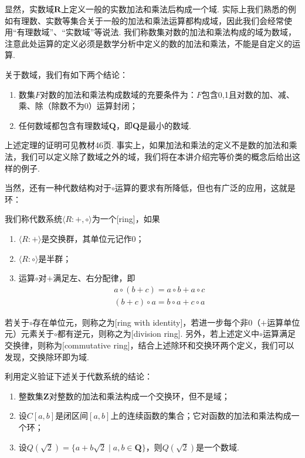 显然，实数域$\mathbf{R}$上定义一般的实数加法和乘法后构成一个域. 实际上我们熟悉的例如有理数、实数等集合关于一般的加法和乘法运算都构成域，因此我们会经常使用``有理数域''、``实数域''等说法. 我们称数集对数的加法和乘法构成的域为数域，注意此处运算的定义必须是数学分析中定义的数的加法和乘法，不能是自定义的运算.
\begin{theorem}
    关于数域，我们有如下两个结论：
    \begin{enumerate}
        \item 数集$F$对数的加法和乘法构成数域的充要条件为：$F$包含0,1且对数的加、减、乘、除（除数不为0）运算封闭；

        \item 任何数域都包含有理数域$\mathbf{Q}$，即$\mathbf{Q}$是最小的数域.
    \end{enumerate}
\end{theorem}

上述定理的证明可见教材46页. 事实上，如果加法和乘法的定义不是数的加法和乘法，我们可以定义除了数域之外的域，我们将在本讲介绍完等价类的概念后给出这样的例子.

当然，还有一种代数结构对于$\circ$运算的要求有所降低，但也有广泛的应用，这就是环：
\begin{definition}[环]
    我们称代数系统$\langle R:+,\circ\rangle$为一个[ring]，如果
    \begin{enumerate}
        \item $\langle R:+\rangle$是交换群，其单位元记作0；

        \item $\langle R:\circ\rangle$是半群；

        \item 运算$\circ$对$+$满足左、右分配律，即
              \begin{gather*}
                  a\circ(b+c)=a\circ b+a\circ c \\
                  (b+c)\circ a=b\circ a+c\circ a
              \end{gather*}
    \end{enumerate}

    若关于$\circ$存在单位元，则称之为[ring with identity]，若进一步每个非0（$+$运算单位元）元素关于$\circ$都有逆元，则称之为[division ring]. 另外，若上述定义中$\circ$运算满足交换律，则称为[commutative ring]，结合上述除环和交换环两个定义，我们可以发现，交换除环即为域.
\end{definition}

\begin{example}
    利用定义验证下述关于代数系统的结论：
    \begin{enumerate}
        \item 整数集$\mathbf{Z}$对整数的加法和乘法构成一个交换环，但不是域；

        \item 设$C[a,b]$是闭区间$[a,b]$上的连续函数的集合；它对函数的加法和乘法构成一个环；

        \item 设$Q(\sqrt{2})=\{a+b\sqrt{2} \mid a,b\in\mathbf{Q}\}$，则$Q(\sqrt{2})$是一个数域.
    \end{enumerate}
\end{example}


